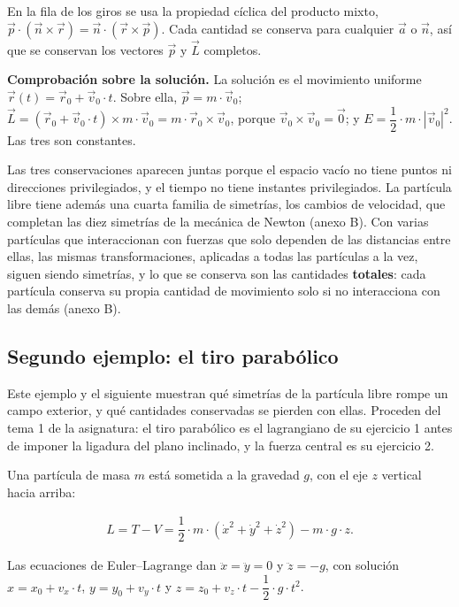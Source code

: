 \documentclass[11pt,a4paper,spanish]{book}
\begin{document}
En la fila de los giros se usa la propiedad cíclica del producto mixto,
\(\vec{p} \cdot (\vec{n} \times \vec{r}) = \vec{n} \cdot (\vec{r} \times \vec{p})\).
Cada cantidad se conserva para cualquier \(\vec{a}\) o \(\vec{n}\), así
que se conservan los vectores \(\vec{p}\) y \(\vec{L}\) completos.

\textbf{Comprobación sobre la solución.} La solución es el movimiento
uniforme \(\vec{r}(t) = \vec{r}_0 + \vec{v}_0 \cdot t\). Sobre ella,
\(\vec{p} = m \cdot \vec{v}_0\);
\(\vec{L} = (\vec{r}_0 + \vec{v}_0 \cdot t) \times m \cdot \vec{v}_0 = m \cdot \vec{r}_0 \times \vec{v}_0\),
porque \(\vec{v}_0 \times \vec{v}_0 = \vec{0}\); y
\(E = \dfrac{1}{2} \cdot m \cdot |\vec{v}_0|^2\). Las tres son
constantes.

Las tres conservaciones aparecen juntas porque el espacio vacío no tiene
puntos ni direcciones privilegiados, y el tiempo no tiene instantes
privilegiados. La partícula libre tiene además una cuarta familia de
simetrías, los cambios de velocidad, que completan las diez simetrías de
la mecánica de Newton (anexo B). Con varias partículas que interaccionan
con fuerzas que solo dependen de las distancias entre ellas, las mismas
transformaciones, aplicadas a todas las partículas a la vez, siguen
siendo simetrías, y lo que se conserva son las cantidades
\textbf{totales}: cada partícula conserva su propia cantidad de
movimiento solo si no interacciona con las demás (anexo B).

\subsection{Segundo ejemplo: el tiro
parabólico}\label{segundo-ejemplo-el-tiro-parabuxf3lico}

Este ejemplo y el siguiente muestran qué simetrías de la partícula libre
rompe un campo exterior, y qué cantidades conservadas se pierden con
ellas. Proceden del tema 1 de la asignatura: el tiro parabólico es el
lagrangiano de su ejercicio 1 antes de imponer la ligadura del plano
inclinado, y la fuerza central es su ejercicio 2.

Una partícula de masa \(m\) está sometida a la gravedad \(g\), con el
eje \(z\) vertical hacia arriba:

\[
\begin{aligned}
L = T - V = \dfrac{1}{2} \cdot m \cdot (\dot{x}^2 + \dot{y}^2 + \dot{z}^2) - m \cdot g \cdot z.
\end{aligned}
\]

Las ecuaciones de Euler--Lagrange dan \(\ddot{x} = \ddot{y} = 0\) y
\(\ddot{z} = -g\), con solución \(x = x_0 + v_x \cdot t\),
\(y = y_0 + v_y \cdot t\) y
\(z = z_0 + v_z \cdot t - \dfrac{1}{2} \cdot g \cdot t^2\).
\end{document}
